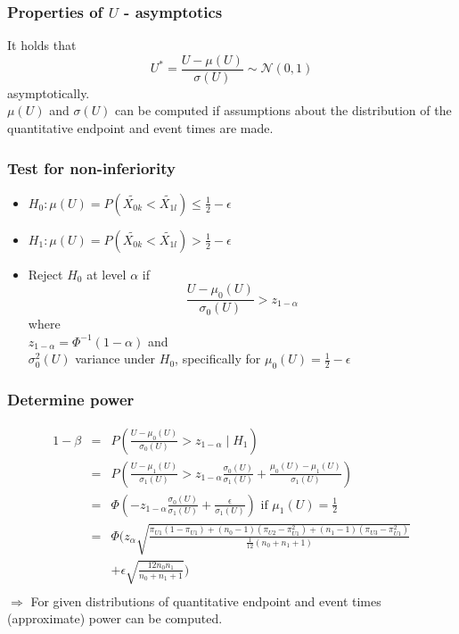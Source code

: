 \documentclass[xcolor=pdftex,dvipsnames,table]{beamer}\usepackage[]{graphicx}\usepackage[]{color}
\begin{document}
\begin{frame} %
\frametitle{Properties of $U$ - asymptotics}
It holds that
  $$ U^{*} = \frac{U - \mu(U)}{\sigma(U)} \sim \mathcal{N} (0, 1)$$ asymptotically.\\
\vspace{0.5cm}
$\mu(U)$ and $\sigma(U)$ can be computed if assumptions about the distribution of the quantitative endpoint and 
event times are made.
\end{frame}

\begin{frame} %
\frametitle{Test for non-inferiority}
\begin{itemize}
  \item $H_0:  
  \mu(U) = P(\tilde{X_{0k}} < \tilde{X_{1l}}) \leq \frac{1}{2} - \epsilon$ \\
  \item $H_1:  \mu(U) = P(\tilde{X_{0k}} < \tilde{X_{1l}}) > \frac{1}{2} - \epsilon $ \\
  \item Reject $H_0$ at level $\alpha$ if
        $$ \frac{U - \mu_0(U)}{\sigma_0(U)}  > z_{1-\alpha} $$ 
        where \\
        $z_{1-\alpha} = \Phi^{-1}({1-\alpha})$ and \\
        $\sigma_0^2(U)$  variance under $H_0$, specifically for 
        $ \mu_0(U) =  \frac{1}{2} - \epsilon$ 
\end{itemize}
\end{frame}

\begin{frame} %
\frametitle{Determine power}
\begin{eqnarray*}
  1 - \beta & = & P(\frac{U - \mu_0(U)}{\sigma_0(U)}  > z_{1-\alpha} \mid H_1) \\
            & = & P \left(\frac{U - \mu_1(U)}{\sigma_1(U)}  > z_{1-\alpha}\frac{\sigma_0(U)}{\sigma_1(U)} + 
                    \frac{\mu_0(U) - \mu_1(U)}{\sigma_1(U)} \right) \\
            & = & \Phi\left(- z_{1-\alpha}\frac{\sigma_0(U)}{\sigma_1(U)} + \frac{\epsilon}{\sigma_1(U)}\right) \mbox{ if } \mu_1(U) = \frac{1}{2}\\
            & = & \Phi\bigg(z_{\alpha} \textstyle \sqrt{\frac{\pi_{U1} (1 - \pi_{U1}) + (n_0 - 1) (\pi_{U2} - \pi_{U1}^2) + (n_1 - 1) (\pi_{U3} - \pi_{U1}^2)}{\frac{1}{12}(n_0 + n_1 + 1)}}  \\
            &   & + \epsilon \textstyle \sqrt{\frac{12 n_0 n_1}{n_0 + n_1 + 1}}
            \bigg) \\
\end{eqnarray*}
$\Rightarrow$ For given distributions of quantitative endpoint and event times (approximate) power can be computed.
\end{frame}
\end{document}
